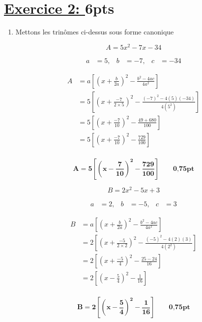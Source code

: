 \documentclass[12pt,a4paper]{article}
\begin{document}
\section*{\underline{Exercice 2: }6pts}
\begin{enumerate}
    \item Mettons les trinômes ci-dessus sous forme canonique 

\[
A = 5x^2 - 7x - 34
\]

\[
\begin{aligned}
a &= 5, & b &= -7, & c &= -34
\end{aligned}
\]

\[
\begin{aligned}
A &= a \left[\left( x + \frac{b}{2a} \right)^2 - \frac{b^2 - 4ac}{4a^2} \right] \\
  &= 5 \left[\left( x + \frac{-7}{2 \times 5} \right)^2 - \frac{(-7)^2 - 4(5)(-34)}{4(5^2)} \right] \\
  &= 5 \left[\left( x + \frac{-7}{10} \right)^2 - \frac{49 + 680}{100} \right] \\
  &= 5 \left[\left( x + \frac{-7}{10} \right)^2 - \frac{729}{100} \right] \\
\end{aligned}
\]

\begin{tcolorbox}[colback=yellow!20, colframe=black, sharp corners]
    \[
    \mathbf{A = 5 \left[\left( x - \frac{7}{10} \right)^2 - \frac{729}{100} \right]} \quad\quad \textbf{0,75pt}
    \]
\end{tcolorbox}


\[
B = 2x^2 - 5x + 3
\]

\[
\begin{aligned}
a &= 2, & b &= -5, & c &= 3
\end{aligned}
\]

\[
\begin{aligned}
B &= a \left[\left( x + \frac{b}{2a} \right)^2 - \frac{b^2 - 4ac}{4a^2} \right] \\
  &= 2 \left[\left( x + \frac{-5}{2 \times 2} \right)^2 - \frac{(-5)^2 - 4(2)(3)}{4(2^2)} \right] \\
  &= 2 \left[\left( x + \frac{-5}{4} \right)^2 - \frac{25 - 24}{16} \right] \\
  &= 2 \left[\left( x - \frac{5}{4} \right)^2 - \frac{1}{16} \right] \\
\end{aligned}
\]

\begin{tcolorbox}[colback=yellow!20, colframe=black, sharp corners]
    \[
    \mathbf{B = 2 \left[\left( x - \frac{5}{4} \right)^2 - \frac{1}{16} \right]} \quad\quad \textbf{0,75pt}
    \]
\end{tcolorbox}


\end{enumerate}
\end{document}

